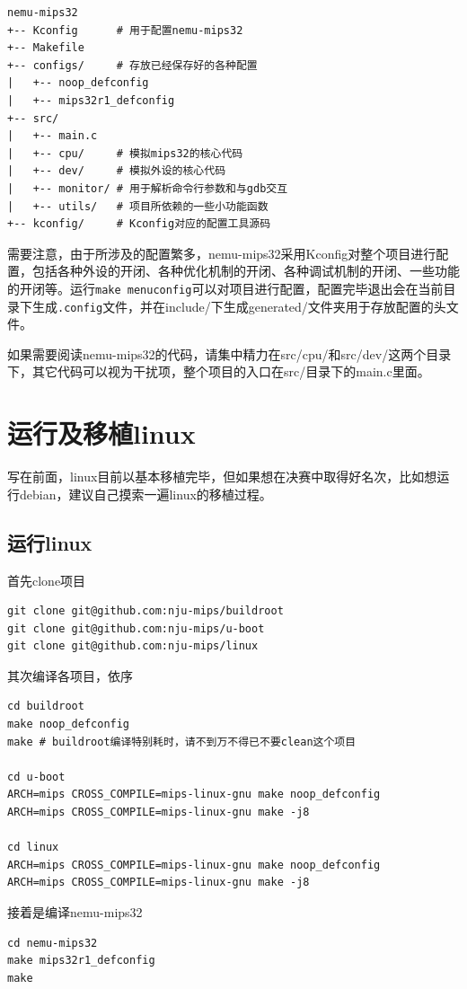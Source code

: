 \documentclass[lang=cn,11pt,a4paper]{elegantpaper}
\begin{document}
\begin{lstlisting}
nemu-mips32
+-- Kconfig      # 用于配置nemu-mips32
+-- Makefile
+-- configs/     # 存放已经保存好的各种配置
|   +-- noop_defconfig
|   +-- mips32r1_defconfig
+-- src/
|   +-- main.c
|   +-- cpu/     # 模拟mips32的核心代码
|   +-- dev/     # 模拟外设的核心代码
|   +-- monitor/ # 用于解析命令行参数和与gdb交互
|   +-- utils/   # 项目所依赖的一些小功能函数
+-- kconfig/     # Kconfig对应的配置工具源码
\end{lstlisting}

需要注意，由于所涉及的配置繁多，nemu-mips32采用Kconfig对整个项目进行配置，包括各种外设的开闭、各种优化机制的开闭、各种调试机制的开闭、一些功能的开闭等。运行\lstinline!make menuconfig!可以对项目进行配置，配置完毕退出会在当前目录下生成\lstinline!.config!文件，并在include/下生成generated/文件夹用于存放配置的头文件。

如果需要阅读nemu-mips32的代码，请集中精力在src/cpu/和src/dev/这两个目录下，其它代码可以视为干扰项，整个项目的入口在src/目录下的main.c里面。

\section{运行及移植linux}

写在前面，linux目前以基本移植完毕，但如果想在决赛中取得好名次，比如想运行debian，建议自己摸索一遍linux的移植过程。

\subsection{运行linux}

首先clone项目
\begin{lstlisting}
git clone git@github.com:nju-mips/buildroot
git clone git@github.com:nju-mips/u-boot
git clone git@github.com:nju-mips/linux
\end{lstlisting}

其次编译各项目，依序
\begin{lstlisting}
cd buildroot
make noop_defconfig
make # buildroot编译特别耗时，请不到万不得已不要clean这个项目

cd u-boot
ARCH=mips CROSS_COMPILE=mips-linux-gnu make noop_defconfig
ARCH=mips CROSS_COMPILE=mips-linux-gnu make -j8

cd linux
ARCH=mips CROSS_COMPILE=mips-linux-gnu make noop_defconfig
ARCH=mips CROSS_COMPILE=mips-linux-gnu make -j8
\end{lstlisting}

接着是编译nemu-mips32
\begin{lstlisting}
cd nemu-mips32
make mips32r1_defconfig
make
\end{lstlisting}
\end{document}
